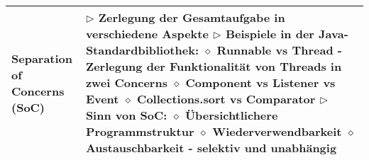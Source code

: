\begin{longtable}{ | p{} p{} | }
	\makecell[l]{Separation of \\ Concerns (SoC)} & \makecell[l]{
	$\rhd$ Zerlegung der Gesamtaufgabe in verschiedene Aspekte \\
	$\rhd$ Beispiele in der Java-Standardbibliothek: \\
	\hspace{0.4cm} $\diamond$ Runnable vs Thread \\
	\hspace{0.6cm} - Zerlegung der Funktionalität von Threads in zwei Concerns \\
	\hspace{0.4cm} $\diamond$ Component vs Listener vs Event \\
	\hspace{0.4cm} $\diamond$ Collections.sort vs Comparator \\
	$\rhd$ Sinn von SoC: \\
	\hspace{0.4cm} $\diamond$ Übersichtlichere Programmstruktur \\
	\hspace{0.4cm} $\diamond$ Wiederverwendbarkeit \\
	\hspace{0.4cm} $\diamond$ Austauschbarkeit - selektiv und unabhängig} \\ \hline	


\end{longtable}
